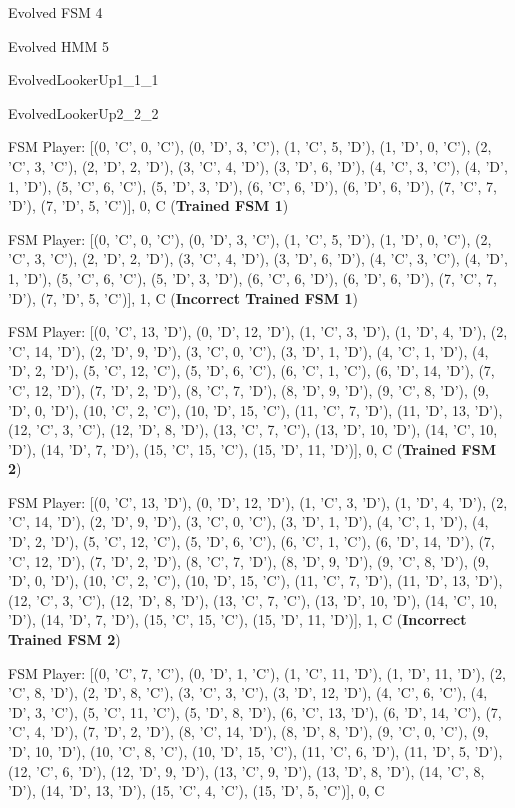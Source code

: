 \item Evolved FSM 4
\item Evolved HMM 5
\item EvolvedLookerUp1\_1\_1
\item EvolvedLookerUp2\_2\_2
\item FSM Player: [(0, 'C', 0, 'C'), (0, 'D', 3, 'C'), (1, 'C', 5, 'D'), (1, 'D', 0, 'C'), (2, 'C', 3, 'C'), (2, 'D', 2, 'D'), (3, 'C', 4, 'D'), (3, 'D', 6, 'D'), (4, 'C', 3, 'C'), (4, 'D', 1, 'D'), (5, 'C', 6, 'C'), (5, 'D', 3, 'D'), (6, 'C', 6, 'D'), (6, 'D', 6, 'D'), (7, 'C', 7, 'D'), (7, 'D', 5, 'C')], 0, C
(\textbf{Trained FSM 1})\item FSM Player: [(0, 'C', 0, 'C'), (0, 'D', 3, 'C'), (1, 'C', 5, 'D'), (1, 'D', 0, 'C'), (2, 'C', 3, 'C'), (2, 'D', 2, 'D'), (3, 'C', 4, 'D'), (3, 'D', 6, 'D'), (4, 'C', 3, 'C'), (4, 'D', 1, 'D'), (5, 'C', 6, 'C'), (5, 'D', 3, 'D'), (6, 'C', 6, 'D'), (6, 'D', 6, 'D'), (7, 'C', 7, 'D'), (7, 'D', 5, 'C')], 1, C
(\textbf{Incorrect Trained FSM 1})\item FSM Player: [(0, 'C', 13, 'D'), (0, 'D', 12, 'D'), (1, 'C', 3, 'D'), (1, 'D', 4, 'D'), (2, 'C', 14, 'D'), (2, 'D', 9, 'D'), (3, 'C', 0, 'C'), (3, 'D', 1, 'D'), (4, 'C', 1, 'D'), (4, 'D', 2, 'D'), (5, 'C', 12, 'C'), (5, 'D', 6, 'C'), (6, 'C', 1, 'C'), (6, 'D', 14, 'D'), (7, 'C', 12, 'D'), (7, 'D', 2, 'D'), (8, 'C', 7, 'D'), (8, 'D', 9, 'D'), (9, 'C', 8, 'D'), (9, 'D', 0, 'D'), (10, 'C', 2, 'C'), (10, 'D', 15, 'C'), (11, 'C', 7, 'D'), (11, 'D', 13, 'D'), (12, 'C', 3, 'C'), (12, 'D', 8, 'D'), (13, 'C', 7, 'C'), (13, 'D', 10, 'D'), (14, 'C', 10, 'D'), (14, 'D', 7, 'D'), (15, 'C', 15, 'C'), (15, 'D', 11, 'D')], 0, C
(\textbf{Trained FSM 2})\item FSM Player: [(0, 'C', 13, 'D'), (0, 'D', 12, 'D'), (1, 'C', 3, 'D'), (1, 'D', 4, 'D'), (2, 'C', 14, 'D'), (2, 'D', 9, 'D'), (3, 'C', 0, 'C'), (3, 'D', 1, 'D'), (4, 'C', 1, 'D'), (4, 'D', 2, 'D'), (5, 'C', 12, 'C'), (5, 'D', 6, 'C'), (6, 'C', 1, 'C'), (6, 'D', 14, 'D'), (7, 'C', 12, 'D'), (7, 'D', 2, 'D'), (8, 'C', 7, 'D'), (8, 'D', 9, 'D'), (9, 'C', 8, 'D'), (9, 'D', 0, 'D'), (10, 'C', 2, 'C'), (10, 'D', 15, 'C'), (11, 'C', 7, 'D'), (11, 'D', 13, 'D'), (12, 'C', 3, 'C'), (12, 'D', 8, 'D'), (13, 'C', 7, 'C'), (13, 'D', 10, 'D'), (14, 'C', 10, 'D'), (14, 'D', 7, 'D'), (15, 'C', 15, 'C'), (15, 'D', 11, 'D')], 1, C
(\textbf{Incorrect Trained FSM 2})\item FSM Player: [(0, 'C', 7, 'C'), (0, 'D', 1, 'C'), (1, 'C', 11, 'D'), (1, 'D', 11, 'D'), (2, 'C', 8, 'D'), (2, 'D', 8, 'C'), (3, 'C', 3, 'C'), (3, 'D', 12, 'D'), (4, 'C', 6, 'C'), (4, 'D', 3, 'C'), (5, 'C', 11, 'C'), (5, 'D', 8, 'D'), (6, 'C', 13, 'D'), (6, 'D', 14, 'C'), (7, 'C', 4, 'D'), (7, 'D', 2, 'D'), (8, 'C', 14, 'D'), (8, 'D', 8, 'D'), (9, 'C', 0, 'C'), (9, 'D', 10, 'D'), (10, 'C', 8, 'C'), (10, 'D', 15, 'C'), (11, 'C', 6, 'D'), (11, 'D', 5, 'D'), (12, 'C', 6, 'D'), (12, 'D', 9, 'D'), (13, 'C', 9, 'D'), (13, 'D', 8, 'D'), (14, 'C', 8, 'D'), (14, 'D', 13, 'D'), (15, 'C', 4, 'C'), (15, 'D', 5, 'C')], 0, C
